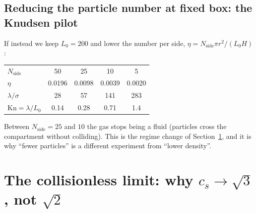 \documentclass[11pt,a4paper]{article}
\begin{document}
\subsection{Reducing the particle number at fixed box: the Knudsen pilot}
If instead we keep $L_0 = 200$ and lower the number per side, $\eta = N_{\mathrm{side}}\pi r^2/(L_0 H)$:
\begin{worked}
\begin{tabular}{@{}lcccc@{}}
\toprule
$N_{\mathrm{side}}$ & 50 & 25 & 10 & 5\\
$\eta$ & 0.0196 & 0.0098 & 0.0039 & 0.0020\\
$\lambda/\sigma$ & 28 & 57 & 141 & 283\\
$\mathrm{Kn} = \lambda/L_0$ & 0.14 & 0.28 & 0.71 & 1.4\\
\bottomrule
\end{tabular}

Between $N_{\mathrm{side}} = 25$ and $10$ the gas stops being a fluid (particles cross the compartment without colliding). This is the regime change of Section~\ref{sec:collisionless}, and it is why ``fewer particles'' is a different experiment from ``lower density''.
\end{worked}

\section{The collisionless limit: why \texorpdfstring{$c_s \to \sqrt3$, not $\sqrt2$}{cs -> sqrt3, not sqrt2}}
\label{sec:collisionless}
\end{document}
